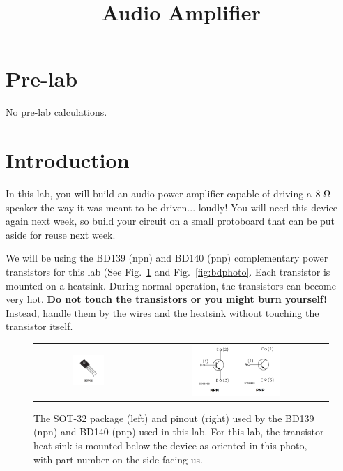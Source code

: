 \documentclass[12pt]{article}
\begin{document}

\title{Audio Amplifier}

\maketitle

\section{Pre-lab}

No pre-lab calculations.

\section{Introduction}

In this lab, you will build an audio power amplifier capable of driving a $8~\rm \Omega$ speaker the way it was meant to be driven... loudly!  You will need this device again next week, so build your circuit on a small protoboard that can be put aside for reuse next week.

We will be using the BD139 (npn) and BD140 (pnp) complementary power transistors for this lab (See Fig.~\ref{fig:bdpackage} and Fig.~\ref{fig:bdphoto}.  Each transistor is mounted on a heatsink.  During normal operation, the transistors can become very hot.  {\bf Do not touch the transistors or you might burn yourself!}  Instead, handle them by the wires and the heatsink without touching the transistor itself.

\begin{figure}[htbp]
\begin{center}
\begin{tabular}{cc}
\includegraphics[width=0.30\textwidth]{figs/bd139140_package.png} &
\includegraphics[width=0.50\textwidth]{figs/bd139140_pinout.png} \\
\end{tabular}
\end{center}
\caption{The SOT-32 package (left) and pinout (right) used by the BD139 (npn) and BD140 (pnp) used in this lab.  For this lab, the transistor heat sink is mounted below the device as oriented in this photo, with part number on the side facing us.}
\label{fig:bdpackage}
\end{figure}
\end{document}

